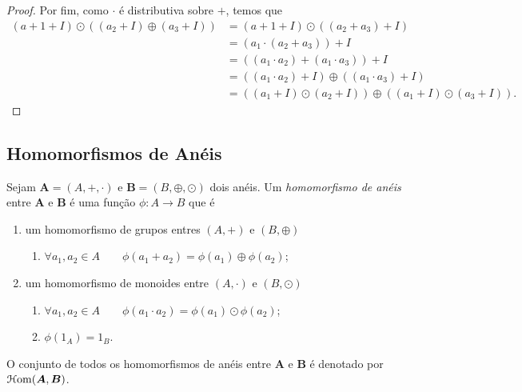 \begin{proof}
	Por fim, como $\cdot$ é distributiva sobre $+$, temos que
	\begin{align*}
	(a+1+I)\odot((a_2+I)\oplus(a_3+I)) &= (a+1+I)\odot((a_2+a_3)+I) \\
		&= (a_1 \cdot (a_2+a_3))+I \\
		&= ((a_1 \cdot a_2) + (a_1 \cdot a_3))+I \\
		&= ((a_1 \cdot a_2)+I) \oplus ((a_1 \cdot a_3)+I) \\
		&= ((a_1+I)\odot(a_2+I))\oplus((a_1+I)\odot(a_3+I)).
	\end{align*}
\end{proof}

\subsection{Homomorfismos de Anéis}

\begin{defi}
	Sejam $\bm A=(A,+,\cdot)$ e $\bm B=(B,\oplus,\odot)$ dois anéis. Um \emph{homomorfismo de anéis} entre $\bm A$ e $\bm B$ é uma função $\phi: A \to B$ que é
	\begin{enumerate}
	\item um homomorfismo de grupos entres $(A,+)$ e $(B,\oplus)$
		\begin{enumerate}
		\item $\forall a_1,a_2 \in A \qquad \phi(a_1 + a_2) = \phi(a_1) \oplus \phi(a_2)$;
		\end{enumerate}
	\item um homomorfismo de monoides entre $(A,\cdot)$ e $(B,\odot)$
		\begin{enumerate}
		\item $\forall a_1,a_2 \in A \qquad \phi(a_1 \cdot a_2) = \phi(a_1) \odot \phi(a_2)$;
		\item $\phi(1_A)=1_B$.
		\end{enumerate}
	\end{enumerate}

	O conjunto de todos os homomorfismos de anéis entre $\bm A$ e $\bm B$ é denotado por $\mathcal{H}\mathrm{om}(\bm A,\bm B)$.
\end{defi}

